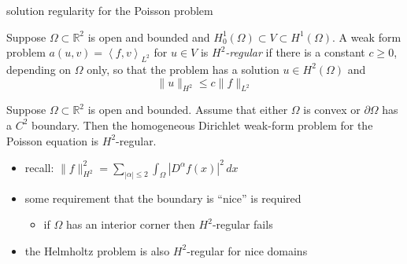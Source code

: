 \documentclass[10pt,
               svgnames,
               hyperref={colorlinks,
                         citecolor=DeepPink4,
                         linkcolor=FireBrick,
                         urlcolor=blue},
               usepdftitle=false]{beamer}
\newcommand{\RR}{\mathbb{R}}
\newcommand{\ds}{\displaystyle}
\newcommand{\ip}[2]{\left<#1,#2\right>}
\begin{document}
\begin{frame}{solution regularity for the Poisson problem}

\begin{definition}[$H^2$ regularity]
Suppose $\Omega\subset \RR^2$ is open and bounded and $H_0^1(\Omega) \subset V \subset H^1(\Omega)$.  A weak form problem $a(u,v)=\ip{f}{v}_{L^2}$ for $u\in V$ is \alert{\emph{$H^2$-regular}} if there is a constant $c\ge 0$, depending on $\Omega$ only, so that the problem has a solution $u\in H^2(\Omega)$ and
	$$\|u\|_{H^2} \le c \|f\|_{L^2}$$
\end{definition}

\begin{theorem}
Suppose $\Omega\subset \RR^2$ is open and bounded.  Assume that either $\Omega$ is convex or $\partial \Omega$ has a $C^2$ boundary.  Then the homogeneous Dirichlet weak-form problem for the Poisson equation is $H^2$-regular.
\end{theorem}

\begin{itemize}
\item recall: \quad $\ds \|f\|_{H^2}^2 = \sum_{|\alpha|\le 2} \int_\Omega |D^\alpha f(x)|^2\,dx$
\item some requirement that the boundary is ``nice'' is required
    \begin{itemize}
    \item[$\circ$] if $\Omega$ has an interior corner then $H^2$-regular fails
    \end{itemize}
\item the Helmholtz problem is also $H^2$-regular for nice domains
\end{itemize}
\end{frame}
\end{document}
